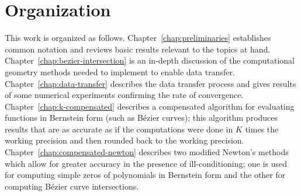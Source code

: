 \section{Organization}

This work is organized as follows. Chapter~\ref{chap:preliminaries}
establishes common notation and reviews basic results relevant to the
topics at hand. Chapter~\ref{chap:bezier-intersection} is an
in-depth discussion of the computational geometry methods needed
to implement to enable data transfer. Chapter~\ref{chap:data-transfer}
describes the data transfer process and gives results of some
numerical experiments confirming the rate of convergence.
Chapter~\ref{chap:k-compensated} describes a compensated algorithm for
evaluating functions in Bernstein form (such as B\'{e}zier curves);
this algorithm produces results that are as accurate as if
the computations were done in \(K\) times the working precision
and then rounded back to the working precision.
Chapter~\ref{chap:compensated-newton} describes two modified Newton's
methods which allow for greater accuracy in the presence of
ill-conditioning; one is used for computing simple zeros
of polynomials in Bernstein form and the other for computing
B\'{e}zier curve intersections.
